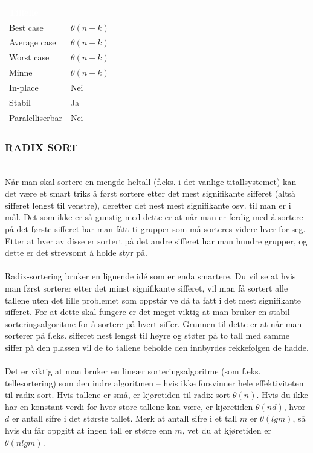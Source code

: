 \begin{table}[H]
    \label{tab:bubblesort}
    \centering
    \begin{tabular}{|L{15em} | L{15em}|}
        \hline
        \textbf{\textcolor{white}{Tilfelle}} & \textbf{\textcolor{white}{}}\\
        Best case & $\theta(n + k)$\\
        Average case & $\theta(n + k)$\\
        Worst case & $\theta(n + k)$\\
        Minne & $\theta(n + k)$\\
        In-place & Nei\\
        Stabil & Ja\\
        Paralelliserbar & Nei\\
         \hline
    \end{tabular}
\end{table}

\subsubsection{RADIX SORT}\\
Når man skal sortere en mengde heltall (f.eks. i det vanlige titallsystemet) kan det være et smart triks å først sortere etter det mest signifikante sifferet (altså sifferet lengst til venstre), deretter det nest mest signifikante osv. til man er i mål. Det som ikke er så gunstig med dette er at når man er ferdig med å sortere på det første sifferet har man fått ti grupper som må sorteres videre hver for seg. Etter at hver av disse er sortert på det andre sifferet har man hundre grupper, og dette er det strevsomt å holde styr på.
\\\\
Radix-sortering bruker en lignende idé som er enda smartere. Du vil se at hvis man først sorterer etter det minst signifikante sifferet, vil man få sortert alle tallene uten det lille problemet som oppstår ve då ta fatt i det mest signifikante sifferet. For at dette skal fungere er det meget viktig at man bruker en stabil sorteringsalgoritme for å sortere på hvert siffer. Grunnen til dette er at når man sorterer på f.eks. sifferet nest lengst til høyre og støter på to tall med samme siffer på den plassen vil de to tallene beholde den innbyrdes rekkefølgen de hadde.
\\\\
Det er viktig at man bruker en lineær sorteringsalgoritme (som f.eks. tellesortering) som den indre algoritmen – hvis ikke forsvinner hele effektiviteten til radix sort. Hvis tallene er små, er kjøretiden til radix sort $\theta(n)$. Hvis du ikke har en konstant verdi for hvor store tallene kan være, er kjøretiden $\theta(nd)$, hvor $d$ er antall sifre i det største tallet. Merk at antall sifre i et tall $m$ er $\theta(lg m)$, så hvis du får oppgitt at ingen tall er større enn $m$, vet du at kjøretiden er $\theta(n lg m)$. 

